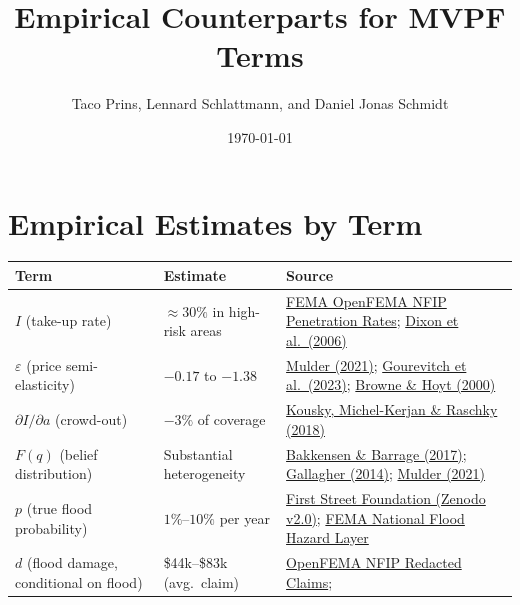 \documentclass[12pt]{article}
\title{Empirical Counterparts for MVPF Terms}
\author{Taco Prins, Lennard Schlattmann, and Daniel Jonas Schmidt}
\date{\today}
\begin{document}
\maketitle

\section*{Empirical Estimates by Term}

\begin{table}[h]
\centering
\small
\renewcommand{\arraystretch}{1}
\begin{tabularx}{\linewidth}{p{4.6cm}p{4.3cm}X}
\toprule
\textbf{Term} & \textbf{Estimate} & \textbf{Source} \\
\midrule
$I$ (take-up rate)
    & $\approx 30\%$ in high-risk areas
    & \href{https://www.fema.gov/openfema-data-page/nfip-residential-penetration-rates-v1}{FEMA OpenFEMA NFIP Penetration Rates}; \href{https://www.rand.org/content/dam/rand/pubs/technical_reports/2006/RAND_TR300.pdf}{Dixon et al.\ (2006)} \\
$\varepsilon$ (price semi-elasticity)
    & $-0.17$ to $-1.38$
    & \href{https://faculty.wharton.upenn.edu/wp-content/uploads/2017/07/MismeasuringRisk_Mulder2021.pdf}{Mulder (2021)};
      \href{https://journalofcrr.com/research/03-07-gourevitch-et-al/}{Gourevitch et al.\ (2023)};
      \href{https://link.springer.com/article/10.1023/A:1007823631497}{Browne \& Hoyt (2000)} \\
$\partial I / \partial a$ (crowd-out)
    & $-3\%$ of coverage
    & \href{https://www.sciencedirect.com/science/article/abs/pii/S0095069617303479}{Kousky, Michel-Kerjan \& Raschky (2018)} \\
$F(q)$ (belief distribution)
    & Substantial heterogeneity
    & \href{https://www.nber.org/system/files/working_papers/w23854/w23854.pdf}{Bakkensen \& Barrage (2017)};
      \href{https://www.aeaweb.org/articles?id=10.1257/app.6.3.206}{Gallagher (2014)};
      \href{https://faculty.wharton.upenn.edu/wp-content/uploads/2017/07/MismeasuringRisk_Mulder2021.pdf}{Mulder (2021)} \\
$p$ (true flood probability)
    & $1\%$--$10\%$ per year
    & \href{https://zenodo.org/records/6459076}{First Street Foundation (Zenodo v2.0)};
      \href{https://www.fema.gov/flood-maps/national-flood-hazard-layer}{FEMA National Flood Hazard Layer} \\
$d$ (flood damage, conditional on flood)
    & \$44k--\$83k (avg.\ claim)
    & \href{https://www.fema.gov/openfema-data-page/fima-nfip-redacted-claims-v2}{OpenFEMA NFIP Redacted Claims};

\end{tabularx}
\end{table}
\end{document}
